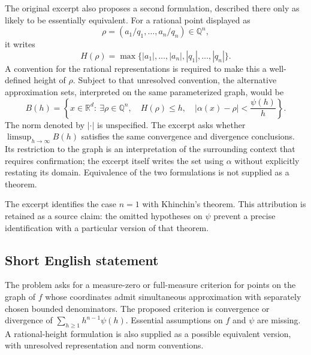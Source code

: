 \documentclass[11pt]{article}
\newcommand{\Q}{\mathbb{Q}}
\newcommand{\R}{\mathbb{R}}
\begin{document}
The original excerpt also proposes a second formulation, described there only as likely to be essentially equivalent. For a rational point displayed as
\[
\rho=(a_1/q_1,\ldots,a_n/q_n)\in\Q^n,
\]
it writes
\[
H(\rho)=\max\{|a_1|,\ldots,|a_n|,|q_1|,\ldots,|q_n|\}.
\]
A convention for the rational representations is required to make this a well-defined height of \(\rho\). Subject to that unresolved convention, the alternative approximation sets, interpreted on the same parameterized graph, would be
\[
B(h)=\left\{x\in\R^d:\ \exists\rho\in\Q^n,\quad H(\rho)\leq h,\quad
|\alpha(x)-\rho|<\frac{\psi(h)}{h}\right\}.
\]
The norm denoted by \(|\cdot|\) is unspecified. The excerpt asks whether \(\limsup_{h\to\infty}B(h)\) satisfies the same convergence and divergence conclusions. Its restriction to the graph is an interpretation of the surrounding context that requires confirmation; the excerpt itself writes the set using \(\alpha\) without explicitly restating its domain. Equivalence of the two formulations is not supplied as a theorem.

The excerpt identifies the case \(n=1\) with Khinchin's theorem. This attribution is retained as a source claim: the omitted hypotheses on \(\psi\) prevent a precise identification with a particular version of that theorem.
\subsection{Short English statement}
The problem asks for a measure-zero or full-measure criterion for points on the graph of \(f\) whose coordinates admit simultaneous approximation with separately chosen bounded denominators. The proposed criterion is convergence or divergence of \(\sum_{h\geq1}h^{n-1}\psi(h)\). Essential assumptions on \(f\) and \(\psi\) are missing. A rational-height formulation is also supplied as a possible equivalent version, with unresolved representation and norm conventions.
\end{document}
